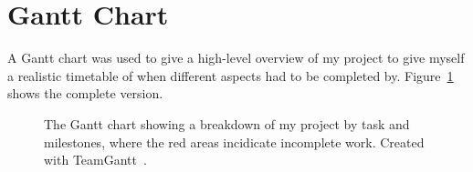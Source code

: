 
\section{Gantt Chart}

A Gantt chart was used to give a high-level overview of my project to give myself a realistic timetable of when different aspects had to be completed by. Figure~\ref{fig:gantt-chart} shows the complete version.

\newpage

\begin{landscape}
  \begin{figure}
    
    \vspace{150mm}
    \caption{The Gantt chart showing a breakdown of my project by task and milestones, where the red areas incidicate incomplete work. Created with TeamGantt~\cite{}.}
    \label{fig:gantt-chart}
  \end{figure}
\end{landscape}
